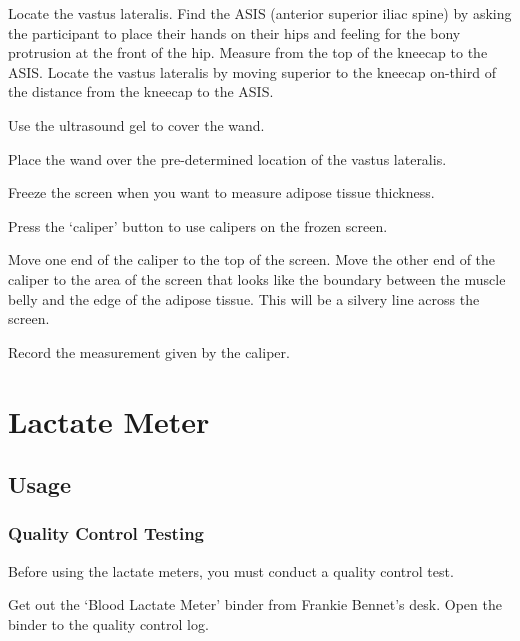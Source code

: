 \documentclass[
]{book}
\begin{document}
Locate the vastus lateralis. Find the ASIS (anterior superior iliac spine) by asking the participant to place their hands on their hips and feeling for the bony protrusion at the front of the hip. Measure from the top of the kneecap to the ASIS. Locate the vastus lateralis by moving superior to the kneecap on-third of the distance from the kneecap to the ASIS.

Use the ultrasound gel to cover the wand.

Place the wand over the pre-determined location of the vastus lateralis.

Freeze the screen when you want to measure adipose tissue thickness.

Press the `caliper' button to use calipers on the frozen screen.

Move one end of the caliper to the top of the screen. Move the other end of the caliper to the area of the screen that looks like the boundary between the muscle belly and the edge of the adipose tissue. This will be a silvery line across the screen.

Record the measurement given by the caliper.

\hypertarget{Appendix-Instruments-LactateMeter}{%
\section{Lactate Meter}\label{Appendix-Instruments-LactateMeter}}

\hypertarget{Appendix-Instruments-LactateMeter-Usage}{%
\subsection{Usage}\label{Appendix-Instruments-LactateMeter-Usage}}

\hypertarget{Appendix-Instruments-LactateMeter-Usage-QualityControl}{%
\subsubsection{Quality Control Testing}\label{Appendix-Instruments-LactateMeter-Usage-QualityControl}}

Before using the lactate meters, you must conduct a quality control test.

Get out the `Blood Lactate Meter' binder from Frankie Bennet's desk. Open the binder to the quality control log.
\end{document}
